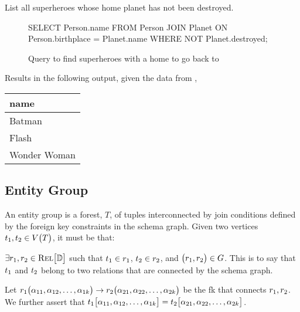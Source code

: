 		\begin{ex}
			List all superheroes whose home planet has not been destroyed.
			
			\begin{figure}[!ht]
				\begin{singlespaced}
					\begin{sqlcode}
SELECT Person.name
FROM   Person
	   JOIN Planet
		 ON Person.birthplace = Planet.name
WHERE  NOT Planet.destroyed;
					\end{sqlcode}
				\end{singlespaced}
				
				\caption{Query to find superheroes with a home to go back to}
			\end{figure}
			
			Results in the following output, given the data from ,
			
			\begin{table}[!ht]
				\centering
				
				\begin{tabular}{l}
					\toprule
					name \\
					\midrule
					Batman \\
					Flash \\
					Wonder Woman \\
					\bottomrule
				\end{tabular}
			\end{table}
		\end{ex}
		
	\subsection{Entity Group}
		\begin{defn}
		\label{def:entity-group}
			An entity group is a forest, $T$,  of tuples interconnected by join conditions defined by the foreign key constraints in the schema graph.	Given two vertices $t_1, t_2 \in V\bigl(T\bigr)$, it must be that:

			$\exists r_1, r_2 \in \textsc{Rel}\bigl[\mathbb{D}\bigr]$ such that $t_1 \in r_1$, $t_2\in r_2$, and $\bigl(r_1, r_2\bigr)\in G$.  This is to say that $t_1$ and $t_2$ belong to two relations that are connected by the schema graph.

			Let $r_1\bigl(\alpha_{11}, \alpha_{12}, \dotsc, \alpha_{1k}\bigr) \to r_2\bigl(\alpha_{21}, \alpha_{22}, \dotsc, \alpha_{2k}\bigr)$ be the \gls{fk} that connects $r_1, r_2$.  We further assert that $t_1\bigl[\alpha_{11}, \alpha_{12}, \dotsc, \alpha_{1k}\bigr] = t_2\bigl[\alpha_{21}, \alpha_{22}, \dotsc, \alpha_{2k}\bigr]$.
		\end{defn}
		
